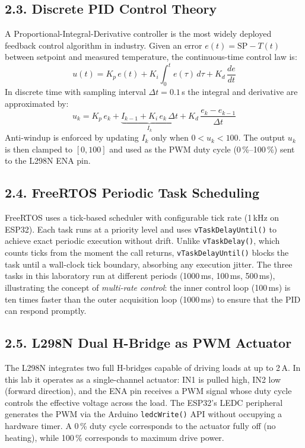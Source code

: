 \documentclass[12pt]{article}
\begin{document}
\subsection*{2.3. Discrete PID Control Theory}

A Proportional-Integral-Derivative controller is the most widely deployed feedback control algorithm
in industry. Given an error $e(t) = \text{SP} - T(t)$ between setpoint and measured temperature, the
continuous-time control law is:
\[
    u(t) = K_p\,e(t) + K_i\!\int_0^t e(\tau)\,d\tau + K_d\,\frac{de}{dt}
\]
In discrete time with sampling interval $\Delta t = 0.1$\,s the integral and derivative are
approximated by:
\[
    u_k = K_p\,e_k + \underbrace{I_{k-1} + K_i\,e_k\,\Delta t}_{I_k} +
          K_d\,\frac{e_k - e_{k-1}}{\Delta t}
\]
Anti-windup is enforced by updating $I_k$ only when $0 < u_k < 100$.  The output $u_k$ is then
clamped to $[0, 100]$ and used as the PWM duty cycle (0\,\%--100\,\%) sent to the L298N ENA pin.

\subsection*{2.4. FreeRTOS Periodic Task Scheduling}

FreeRTOS uses a tick-based scheduler with configurable tick rate (1\,kHz on ESP32). Each task runs
at a priority level and uses \texttt{vTaskDelayUntil()} to achieve exact periodic execution without
drift. Unlike \texttt{vTaskDelay()}, which counts ticks from the moment the call returns,
\texttt{vTaskDelayUntil()} blocks the task until a wall-clock tick boundary, absorbing any execution
jitter. The three tasks in this laboratory run at different periods (1000\,ms, 100\,ms, 500\,ms),
illustrating the concept of \emph{multi-rate control}: the inner control loop (100\,ms) is ten times
faster than the outer acquisition loop (1000\,ms) to ensure that the PID can respond promptly.

\subsection*{2.5. L298N Dual H-Bridge as PWM Actuator}

The L298N integrates two full H-bridges capable of driving loads at up to 2\,A. In this lab it
operates as a single-channel actuator: IN1 is pulled high, IN2 low (forward direction), and the
ENA pin receives a PWM signal whose duty cycle controls the effective voltage across the load.
The ESP32's LEDC peripheral generates the PWM via the Arduino \texttt{ledcWrite()} API without
occupying a hardware timer. A 0\,\% duty cycle corresponds to the actuator fully off (no heating),
while 100\,\% corresponds to maximum drive power.
\end{document}
